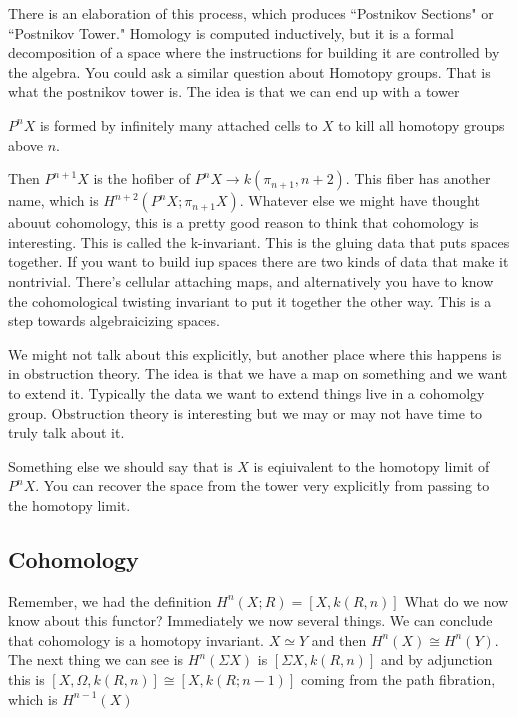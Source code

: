 \documentclass[12pt]{article}
\theoremstyle{definition}
\begin{document}
	There is an elaboration of this process, which produces ``Postnikov Sections" or ``Postnikov Tower." Homology is computed inductively, but it is a formal decomposition of a space where the instructions for building it are controlled by the algebra. You could ask a similar question about Homotopy groups. That is what the postnikov tower is. The idea is that we can end up with a tower \begin{center}
	\end{center}
	$P^nX$ is formed by infinitely many attached cells to $X$ to kill all homotopy groups above $n$. 
	\begin{center}
	\end{center}
	Then $P^{n+1} X$ is the hofiber of $P^nX\to k(\pi_{n+1}, n+2)$. This fiber has another name, which is $H^{n+2}(P^n X; \pi_{n+1}X)$. Whatever else we might have thought abouut cohomology, this is a pretty good reason to think that cohomology is interesting. This is called the k-invariant. This is the gluing data that puts spaces together. If you want to build iup spaces there are two kinds of data that make it nontrivial. There's cellular attaching maps, and alternatively you have to know the cohomological twisting invariant to put it together the other way. This is a step towards algebraicizing spaces. 
	
	We might not talk about this explicitly, but another place where this happens is in obstruction theory. The idea is that we have a map on something and we want to extend it. Typically the data we want to extend things live in a cohomolgy group. Obstruction theory is interesting but we may or may not have time to truly talk about it. 
	
	Something else we should say that is $X$ is eqiuivalent to the homotopy limit of $P^nX$. You can recover the space from the tower very explicitly from passing to the homotopy limit.
	\subsection{Cohomology}
	Remember, we had the definition	$H^n(X;R)=[X,k(R,n)]$ What do we now know about this functor? Immediately we now several things. We can conclude that cohomology is a homotopy invariant. $X\simeq Y$ and then $H^n(X)\cong H^n(Y)$. The next thing we can see is $H^n(\Sigma X)$ is $[\Sigma X,k(R,n)] $ and by adjunction this is $[X,\Omega, k(R,n)]\cong [X,k(R;n-1)]$ coming from the path fibration, which is $H^{n-1}(X)$
	
\end{document}
